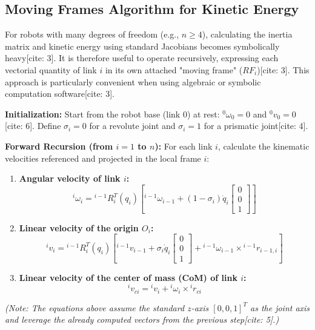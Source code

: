 \documentclass[11pt,a4paper]{article}
\begin{document}
\subsection{Moving Frames Algorithm for Kinetic Energy}
For robots with many degrees of freedom (e.g., $n \ge 4$), calculating the inertia matrix and kinetic energy using standard Jacobians becomes symbolically heavy[cite: 3]. It is therefore useful to operate recursively, expressing each vectorial quantity of link $i$ in its own attached "moving frame" ($RF_i$)[cite: 3]. This approach is particularly convenient when using algebraic or symbolic computation software[cite: 3].

\textbf{Initialization:}
Start from the robot base (link 0) at rest: ${}^0\omega_0 = 0$ and ${}^0v_0 = 0$[cite: 6]. 
Define $\sigma_i = 0$ for a revolute joint and $\sigma_i = 1$ for a prismatic joint[cite: 4].

\textbf{Forward Recursion (from $i=1$ to $n$):}
For each link $i$, calculate the kinematic velocities referenced and projected in the local frame $i$:
\begin{enumerate}
    \item \textbf{Angular velocity of link $i$:}
    \begin{equation}
        {}^i\omega_i = {}^{i-1}R_i^T(q_i) \left[ {}^{i-1}\omega_{i-1} + (1 - \sigma_i) \dot{q}_i \begin{bmatrix} 0 \\ 0 \\ 1 \end{bmatrix} \right]
    \end{equation}
    
    \item \textbf{Linear velocity of the origin $O_i$:}
    \begin{equation}
        {}^iv_i = {}^{i-1}R_i^T(q_i) \left[ {}^{i-1}v_{i-1} + \sigma_i \dot{q}_i \begin{bmatrix} 0 \\ 0 \\ 1 \end{bmatrix} + {}^{i-1}\omega_{i-1} \times {}^{i-1}r_{i-1,i} \right]
    \end{equation}
    
    \item \textbf{Linear velocity of the center of mass (CoM) of link $i$:}
    \begin{equation}
        {}^iv_{ci} = {}^iv_i + {}^i\omega_i \times {}^ir_{ci}
    \end{equation}
\end{enumerate}
\textit{(Note: The equations above assume the standard $z$-axis $[0, 0, 1]^T$ as the joint axis and leverage the already computed vectors from the previous step[cite: 5].)}
\end{document}
